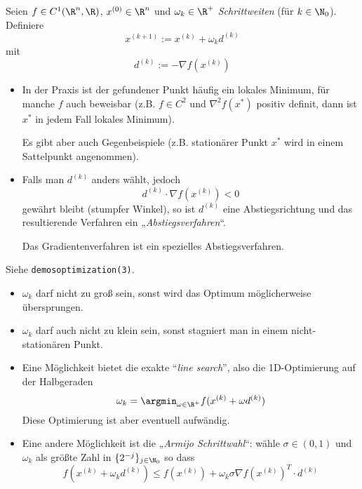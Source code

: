 \documentclass[11pt]{scrbook}
\begin{document}
\begin{df}[Gradientenverfahren] \label{4.6}
	Seien $f \in C^1(\R^n, \R)$, $x^{(0)} \in \R^n$ und $\omega_k \in \R^+$ \emph{Schrittweiten} (für $k \in \N_0$).
	Definiere
	\[
		x^{(k+1)} := x^{(k)} + \omega_k d^{(k)}
	\]
	mit
	\[
		d^{(k)} := - \nabla f(x^{(k)})
	\]
	\begin{note}[Optimalität]
		\begin{itemize}
			\item
				In der Praxis ist der gefundener Punkt häufig ein lokales Minimum, für manche $f$ auch beweisbar (z.B. $f \in C^2$ und $\nabla^2 f(x^*)$ positiv definit, dann ist $x^*$ in jedem Fall lokales Minimum).

				Es gibt aber auch Gegenbeispiele (z.B. stationärer Punkt $x^*$ wird in einem Sattelpunkt angenommen).
		\end{itemize}
	\end{note}
	\begin{note}[Abstiegsrichtung]
		\begin{itemize}
			\item
				Falls man $d^{(k)}$ anders wählt, jedoch
				\[
					d^{(k)} \cdot \nabla f(x^{(k)}) < 0
				\]
				gewährt bleibt (stumpfer Winkel), so ist $d^{(k)}$ eine Abstiegsrichtung und das resultierende Verfahren ein „\emph{Abstiegsverfahren}“.
				
				Das Gradientenverfahren ist ein spezielles Abstiegsverfahren.
		\end{itemize}
	\end{note}
	\begin{note}[Schrittweite]
		Siehe \texttt{demos\textunderscore optimization(3)}.
		\begin{itemize}
			\item
				$\omega_k$ darf nicht zu groß sein, sonst wird das Optimum möglicherweise übersprungen.
			\item
				$\omega_k$ darf auch nicht zu klein sein, sonst stagniert man in einem nicht-stationären Punkt.
			\item
				Eine Möglichkeit bietet die exakte “\emph{line search}”, also die 1D-Optimierung auf der Halbgeraden
				\[
					\omega_k = \argmin_{\omega \in \R^+} f(x^{(k)} + \omega d^{(k)})
				\]
				Diese Optimierung ist aber eventuell aufwändig.
			\item
				Eine andere Möglichkeit ist die „\emph{Armijo Schrittwahl}“: wähle $\sigma \in (0,1)$ und $\omega_k$ als größte Zahl in $\{2^{-j}\}_{j\in \N_0}$ so dass
				\[
					f(x^{(k)} + \omega_k d^{(k)}) \le f(x^{(k)}) + \omega_k \sigma \nabla f(x^{(k)})^T \cdot d^{(k)}
				\]
		\end{itemize}
	\end{note}
\end{df}
\end{document}
